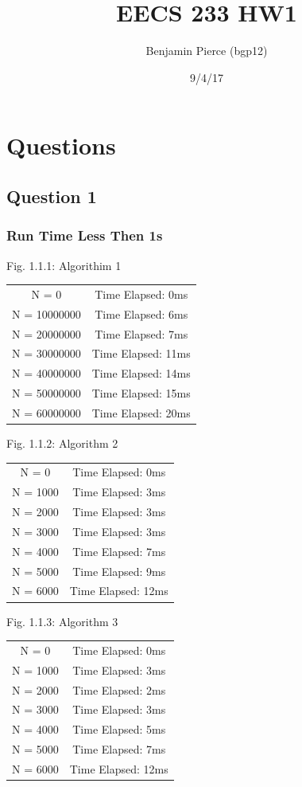 \documentclass[11pt]{article} %
\title{EECS 233 HW1}
\author{Benjamin Pierce (bgp12)}
\date{9/4/17} %
\begin{document}
\maketitle

\section{Questions}



\subsection{Question 1}
\subsubsection{Run Time Less Then 1s}

\begin{center}
Fig. 1.1.1: Algorithim 1
\begin{tabular} { |c|c| }
\hline
N = 0&Time Elapsed: 0ms\\
N = 10000000&Time Elapsed: 6ms\\
N = 20000000&Time Elapsed: 7ms\\
N = 30000000&Time Elapsed: 11ms\\
N = 40000000&Time Elapsed: 14ms\\
N = 50000000&Time Elapsed: 15ms\\
N = 60000000&Time Elapsed: 20ms\\
\hline
\end{tabular}
\end{center}

\begin{center}
Fig. 1.1.2: Algorithm 2
\begin{tabular} { |c|c| }
\hline
N = 0      & Time Elapsed: 0ms \\
N = 1000 & Time Elapsed: 3ms \\
N = 2000 & Time Elapsed: 3ms \\
N = 3000 & Time Elapsed: 3ms \\
N = 4000 & Time Elapsed: 7ms \\
N = 5000 & Time Elapsed: 9ms \\
N = 6000 & Time Elapsed: 12ms \\
\hline
\end{tabular}
\end{center}

\begin{center}
Fig. 1.1.3: Algorithm 3
\begin{tabular} { |c|c| }
\hline
N = 0&Time Elapsed: 0ms \\
N = 1000&Time Elapsed: 3ms \\
N = 2000&Time Elapsed: 2ms \\
N = 3000&Time Elapsed: 3ms \\ 
N = 4000&Time Elapsed: 5ms \\ 
N = 5000&Time Elapsed: 7ms \\
N = 6000&Time Elapsed: 12ms \\
\hline
\end{tabular}
\end{center}
\par
\end{document}
